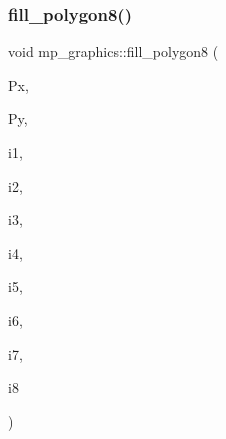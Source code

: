 \mbox{\label{classmp__graphics_a73fa4da86541420bb87c0b7000a160b8}} 
\subsubsection{\texorpdfstring{fill\+\_\+polygon8()}{fill\_polygon8()}}
{\footnotesize\ttfamily void mp\+\_\+graphics\+::fill\+\_\+polygon8 (\begin{DoxyParamCaption}\item[{\mbox{\hyperlink{galois_8h_a09fddde158a3a20bd2dcadb609de11dc}{I\+NT}} $\ast$}]{Px,  }\item[{\mbox{\hyperlink{galois_8h_a09fddde158a3a20bd2dcadb609de11dc}{I\+NT}} $\ast$}]{Py,  }\item[{\mbox{\hyperlink{galois_8h_a09fddde158a3a20bd2dcadb609de11dc}{I\+NT}}}]{i1,  }\item[{\mbox{\hyperlink{galois_8h_a09fddde158a3a20bd2dcadb609de11dc}{I\+NT}}}]{i2,  }\item[{\mbox{\hyperlink{galois_8h_a09fddde158a3a20bd2dcadb609de11dc}{I\+NT}}}]{i3,  }\item[{\mbox{\hyperlink{galois_8h_a09fddde158a3a20bd2dcadb609de11dc}{I\+NT}}}]{i4,  }\item[{\mbox{\hyperlink{galois_8h_a09fddde158a3a20bd2dcadb609de11dc}{I\+NT}}}]{i5,  }\item[{\mbox{\hyperlink{galois_8h_a09fddde158a3a20bd2dcadb609de11dc}{I\+NT}}}]{i6,  }\item[{\mbox{\hyperlink{galois_8h_a09fddde158a3a20bd2dcadb609de11dc}{I\+NT}}}]{i7,  }\item[{\mbox{\hyperlink{galois_8h_a09fddde158a3a20bd2dcadb609de11dc}{I\+NT}}}]{i8 }\end{DoxyParamCaption})}

\mbox{\label{classmp__graphics_a284ff43ba4e4dd5135ecbc3258bddae9}} 
